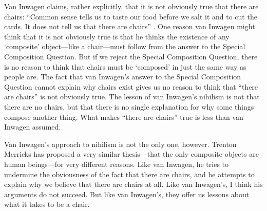 \documentclass[11pt]{article}
\begin{document}
\begin{spacing}{1.5}
Van Inwagen claims, rather explicitly, that it is not obviously true
that there are chairs: ``Common sense tells us to taste our food
before we salt it and to cut the cards.  It does not tell us that
there are chairs'' \citeyearpar[103]{inwagen1995}.  One reason van
Inwagen might think that it is not obviously true is that he thinks
the existence of any `composite' object---like a chair---must follow
from the answer to the Special Composition Question.  But if we reject
the Special Composition Question, there is no reason to think that
chairs must be `composed' in just the same way as people are.  The
fact that van Inwagen's answer to the Special Composition Question
cannot explain why chairs exist gives us no reason to think that
``there are chairs'' is not obviously true.  The lesson of van
Inwagen's nihilism is not that there are no chairs, but that there is
no single explanation for why some things compose another thing.  What
makes ``there are chairs'' true is less than van Inwagen assumed.

Van Inwagen's approach to nihilism is not the only one, however.
Trenton Merricks has proposed a very similar thesis---that the only
composite objects are human beings---for very different reasons.  Like
van Inwagen, he tries to undermine the obviousness of the fact that
there are chairs, and he attempts to explain why we believe that there
are chairs at all.  Like van Inwagen's, I think his arguments do not
succeed.  But like van Inwagen's, they offer us lessons about what it
takes to be a chair.

\ifstandalone
\end{spacing}


\fi
\end{document}
